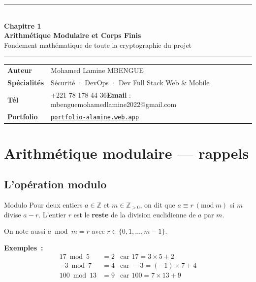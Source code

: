 \documentclass[12pt, a4paper]{article}
\makeatletter
\newcommand{\ZZ}{\mathbb{Z}}
\newcommand{\pmod}[1]{\ (\mathrm{mod}\ #1)}
\newcommand{\auteur}{Mohamed Lamine MBENGUE}
\newcommand{\specialites}{Sécurité · DevOps · Dev Full Stack Web \& Mobile}
\newcommand{\tel}{+221 78 178 44 36}
\newcommand{\email}{mbenguemohamedlamine2022@gmail.com}
\newcommand{\portfolio}{portfolio-alamine.web.app}
\makeatother
\begin{document}
\begin{center}
  {\color{suva_blue}\rule{\linewidth}{2pt}}\\[0.5cm]
  {\Huge\bfseries\color{suva_blue} Chapitre 1}\\[0.3cm]
  {\large\bfseries Arithmétique Modulaire et Corps Finis}\\[0.2cm]
  {\small\color{gray} Fondement mathématique de toute la cryptographie du projet}\\[0.3cm]
  {\color{suva_blue}\rule{\linewidth}{2pt}}
\end{center}

\begin{tcolorbox}[colback=suva_blue!5, colframe=suva_blue!40,
  left=6pt, right=6pt, top=4pt, bottom=4pt]
\small
\begin{tabular}{ll}
  \textbf{Auteur} & \auteur \\
  \textbf{Spécialités} & \specialites \\
  \textbf{Tél} & \tel \quad \textbf{Email} : \email \\
  \textbf{Portfolio} & \href{https://\portfolio}{\texttt{\portfolio}} \\
\end{tabular}
\end{tcolorbox}

\tableofcontents
\newpage

\section{Arithmétique modulaire --- rappels}

\subsection{L'opération modulo}

\begin{defbox}{Modulo}
Pour deux entiers $a \in \ZZ$ et $m \in \ZZ_{>0}$, on dit que
$a \equiv r \pmod{m}$ si $m$ divise $a - r$.
L'entier $r$ est le \textbf{reste} de la division euclidienne de $a$ par $m$.

On note aussi $a \bmod m = r$ avec $r \in \{0, 1, \ldots, m-1\}$.
\end{defbox}

\textbf{Exemples~:}
\begin{align*}
  17 \bmod 5 &= 2  &\text{car } 17 = 3 \times 5 + 2\\
  -3 \bmod 7 &= 4  &\text{car } -3 = (-1) \times 7 + 4\\
  100 \bmod 13 &= 9 &\text{car } 100 = 7 \times 13 + 9
\end{align*}
\end{document}
